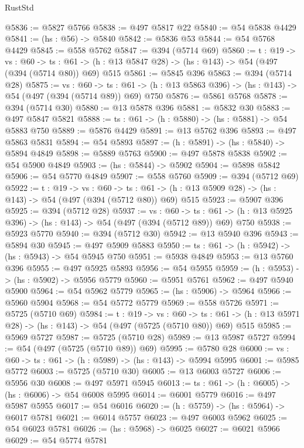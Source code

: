 \begin{lexlean}{RustStd}
\begin{coremodule}
@5836 := @5827 @5766
@5838 := @497 @5817 @22
@5840 := @54 @5838 @4429
@5841 := (hs : @56) -> @5840
@5842 := @5836 @53
@5844 := @54 @5768 @4429
@5845 := @558 @5762
@5847 := @394 (@5714 @69)
@5860 := {t : @19} ->
  {vs : @60} ->
  {ts : @61} -> (h : @13 @5847 @28) -> (hs : @143) -> @54 (@497 (@394 (@5714 @80)) @69) @515
@5861 := @5845 @396
@5863 := @394 (@5714 @28)
@5875 := {vs : @60} ->
  {ts : @61} -> (h : @13 @5863 @396) -> (hs : @143) -> @54 (@497 (@394 (@5714 @89)) @69) @750
@5876 := @5861 @5768
@5878 := @394 (@5714 @30)
@5880 := @13 @5878 @396
@5881 := @5832 @30
@5883 := @497 @5847 @5821
@5888 := {ts : @61} -> (h : @5880) -> (hs : @5881) -> @54 @5883 @750
@5889 := @5876 @4429
@5891 := @13 @5762 @396
@5893 := @497 @5863 @5831
@5894 := @54 @5893
@5897 := (h : @5891) -> (hs : @5840) -> @5894 @4849
@5898 := @5889 @5763
@5900 := @497 @5878 @5838
@5902 := @54 @5900 @4849
@5903 := (hs : @5844) -> @5902
@5904 := @5898 @5842
@5906 := @54 @5770 @4849
@5907 := @558 @5760
@5909 := @394 (@5712 @69)
@5922 := {t : @19} ->
  {vs : @60} ->
  {ts : @61} -> (h : @13 @5909 @28) -> (hs : @143) -> @54 (@497 (@394 (@5712 @80)) @69) @515
@5923 := @5907 @396
@5925 := @394 (@5712 @28)
@5937 := {vs : @60} ->
  {ts : @61} -> (h : @13 @5925 @396) -> (hs : @143) -> @54 (@497 (@394 (@5712 @89)) @69) @750
@5938 := @5923 @5770
@5940 := @394 (@5712 @30)
@5942 := @13 @5940 @396
@5943 := @5894 @30
@5945 := @497 @5909 @5883
@5950 := {ts : @61} -> (h : @5942) -> (hs : @5943) -> @54 @5945 @750
@5951 := @5938 @4849
@5953 := @13 @5760 @396
@5955 := @497 @5925 @5893
@5956 := @54 @5955
@5959 := (h : @5953) -> (hs : @5902) -> @5956 @5779
@5960 := @5951 @5761
@5962 := @497 @5940 @5900
@5964 := @54 @5962 @5779
@5965 := (hs : @5906) -> @5964
@5966 := @5960 @5904
@5968 := @54 @5772 @5779
@5969 := @558 @5726
@5971 := @5725 (@5710 @69)
@5984 := {t : @19} ->
  {vs : @60} ->
  {ts : @61} -> (h : @13 @5971 @28) -> (hs : @143) -> @54 (@497 (@5725 (@5710 @80)) @69) @515
@5985 := @5969 @5727
@5987 := @5725 (@5710 @28)
@5989 := @13 @5987 @5727
@5994 := @54 (@497 (@5725 (@5710 @89)) @69)
@5995 := @5780 @28
@6000 := {vs : @60} -> {ts : @61} -> (h : @5989) -> (hs : @143) -> @5994 @5995
@6001 := @5985 @5772
@6003 := @5725 (@5710 @30)
@6005 := @13 @6003 @5727
@6006 := @5956 @30
@6008 := @497 @5971 @5945
@6013 := {ts : @61} -> (h : @6005) -> (hs : @6006) -> @54 @6008 @5995
@6014 := @6001 @5779
@6016 := @497 @5987 @5955
@6017 := @54 @6016
@6020 := (h : @5759) -> (hs : @5964) -> @6017 @5781
@6021 := @6014 @5757
@6023 := @497 @6003 @5962
@6025 := @54 @6023 @5781
@6026 := (hs : @5968) -> @6025
@6027 := @6021 @5966
@6029 := @54 @5774 @5781

\end{coremodule}
\end{lexlean}
